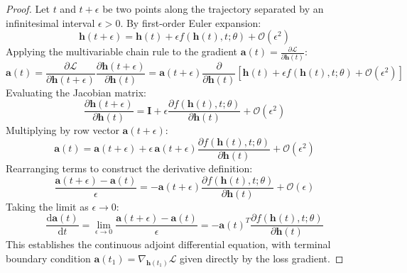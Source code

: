 \documentclass[11pt,a4paper]{article}
\theoremstyle{definition}
\begin{document}
\begin{proof}
Let $t$ and $t + \epsilon$ be two points along the trajectory separated by an infinitesimal interval $\epsilon > 0$.
By first-order Euler expansion:
{\boldmath
\begin{equation}
\mathbf{h}(t + \epsilon) = \mathbf{h}(t) + \epsilon f(\mathbf{h}(t), t; \theta) + \mathcal{O}(\epsilon^2)
\end{equation}
}
Applying the multivariable chain rule to the gradient $\mathbf{a}(t) = \frac{\partial \mathcal{L}}{\partial \mathbf{h}(t)}$:
{\boldmath
\begin{equation}
\mathbf{a}(t) = \frac{\partial \mathcal{L}}{\partial \mathbf{h}(t + \epsilon)} \frac{\partial \mathbf{h}(t + \epsilon)}{\partial \mathbf{h}(t)} = \mathbf{a}(t + \epsilon) \frac{\partial}{\partial \mathbf{h}(t)}\left[ \mathbf{h}(t) + \epsilon f(\mathbf{h}(t), t; \theta) + \mathcal{O}(\epsilon^2) \right]
\end{equation}
}
Evaluating the Jacobian matrix:
{\boldmath
\begin{equation}
\frac{\partial \mathbf{h}(t + \epsilon)}{\partial \mathbf{h}(t)} = \mathbf{I} + \epsilon \frac{\partial f(\mathbf{h}(t), t; \theta)}{\partial \mathbf{h}(t)} + \mathcal{O}(\epsilon^2)
\end{equation}
}
Multiplying by row vector $\mathbf{a}(t + \epsilon)$:
{\boldmath
\begin{equation}
\mathbf{a}(t) = \mathbf{a}(t + \epsilon) + \epsilon \, \mathbf{a}(t + \epsilon) \frac{\partial f(\mathbf{h}(t), t; \theta)}{\partial \mathbf{h}(t)} + \mathcal{O}(\epsilon^2)
\end{equation}
}
Rearranging terms to construct the derivative definition:
{\boldmath
\begin{equation}
\frac{\mathbf{a}(t + \epsilon) - \mathbf{a}(t)}{\epsilon} = -\mathbf{a}(t + \epsilon) \frac{\partial f(\mathbf{h}(t), t; \theta)}{\partial \mathbf{h}(t)} + \mathcal{O}(\epsilon)
\end{equation}
}
Taking the limit as $\epsilon \to 0$:
{\boldmath
\begin{equation}
\frac{\mathrm{d}\mathbf{a}(t)}{\mathrm{d}t} = \lim_{\epsilon \to 0} \frac{\mathbf{a}(t + \epsilon) - \mathbf{a}(t)}{\epsilon} = -\mathbf{a}(t)^T \frac{\partial f(\mathbf{h}(t), t; \theta)}{\partial \mathbf{h}(t)}
\end{equation}
}
This establishes the continuous adjoint differential equation, with terminal boundary condition $\mathbf{a}(t_1) = \nabla_{\mathbf{h}(t_1)} \mathcal{L}$ given directly by the loss gradient.
\end{proof}
\end{document}
